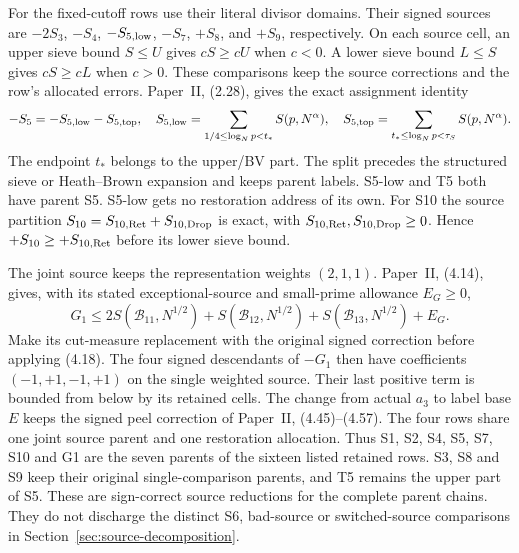 For the fixed-cutoff rows use their literal divisor domains. Their
signed sources are $-2S_3$, $-S_4$, $-S_{5,\rm low}$, $-S_7$,
$+S_8$, and $+S_9$, respectively. On each source cell, an upper sieve
bound $S\le U$ gives $cS\ge cU$ when $c<0$. A lower sieve bound
$L\le S$ gives $cS\ge cL$ when $c>0$. These comparisons keep the source
corrections and the row's allocated errors.
Paper~II, (2.28), gives the exact assignment identity
\[
 -S_5=-S_{5,\rm low}-S_{5,\rm top},\quad
 S_{5,\rm low}=\sum_{1/4\le\log_Np<t_*}S(p,N^\alpha),\quad
 S_{5,\rm top}=\sum_{t_*\le\log_Np<\tau_S}S(p,N^\alpha).
\]
The endpoint $t_*$ belongs to the upper/BV part. The split
precedes the structured sieve or Heath--Brown expansion and keeps
parent labels. S5-low and T5 both have parent S5. S5-low gets no
restoration address of its own.
For S10 the source partition
$S_{10}=S_{10,\rm Ret}+S_{10,\rm Drop}$ is exact, with
$S_{10,\rm Ret},S_{10,\rm Drop}\ge0$. Hence $+S_{10}\ge+S_{10,\rm Ret}$
before its lower sieve bound.

The joint source keeps the representation weights $(2,1,1)$.
Paper~II, (4.14), gives, with its stated exceptional-source and
small-prime allowance $E_G\ge0$,
\[
 G_1\le2S(\mathcal B_{11},N^{1/2})+
          S(\mathcal B_{12},N^{1/2})+
          S(\mathcal B_{13},N^{1/2})+E_G.
\]
Make its cut-measure replacement with the original signed correction
before applying (4.18). The four signed descendants of $-G_1$ then
have coefficients $(-1,+1,-1,+1)$ on the single weighted source.
Their last positive term is bounded from below by its retained cells.
The change from actual $a_3$ to label base $E$ keeps the signed peel
correction of Paper~II, (4.45)--(4.57). The four rows share one
joint source parent and one restoration allocation.
Thus S1, S2, S4, S5, S7, S10 and G1 are the seven parents of the
sixteen listed retained rows. S3, S8 and S9 keep their original
single-comparison parents, and T5 remains the upper part of S5.
These are sign-correct source reductions for the complete parent
chains. They do not discharge the distinct S6, bad-source or
switched-source comparisons in Section~\ref{sec:source-decomposition}.

